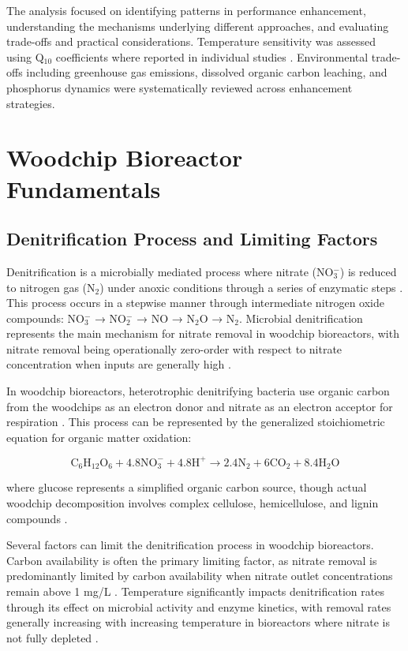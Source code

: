 \documentclass[12pt,a4paper]{article}
\begin{document}
The analysis focused on identifying patterns in performance enhancement, understanding the mechanisms underlying different approaches, and evaluating trade-offs and practical considerations. Temperature sensitivity was assessed using Q$_{10}$ coefficients where reported in individual studies \citep{RN242, RN258}. Environmental trade-offs including greenhouse gas emissions, dissolved organic carbon leaching, and phosphorus dynamics were systematically reviewed across enhancement strategies.

\section{Woodchip Bioreactor Fundamentals}

\subsection{Denitrification Process and Limiting Factors}

Denitrification is a microbially mediated process where nitrate (NO$_{3}^{-}$) is reduced to nitrogen gas (N$_{2}$) under anoxic conditions through a series of enzymatic steps \citep{RN242, RN629}. This process occurs in a stepwise manner through intermediate nitrogen oxide compounds: NO$_{3}^{-}$ → NO$_{2}^{-}$ → NO → N$_{2}$O → N$_{2}$. Microbial denitrification represents the main mechanism for nitrate removal in woodchip bioreactors, with nitrate removal being operationally zero-order with respect to nitrate concentration when inputs are generally high \citep{RN625, RN242}.

In woodchip bioreactors, heterotrophic denitrifying bacteria use organic carbon from the woodchips as an electron donor and nitrate as an electron acceptor for respiration \citep{RN242, RN725}. This process can be represented by the generalized stoichiometric equation for organic matter oxidation:

\begin{equation}
\text{C}_6\text{H}_{12}\text{O}_6 + 4.8\text{NO}_{3}^{-} + 4.8\text{H}^{+} \rightarrow 2.4\text{N}_{2} + 6\text{CO}_{2} + 8.4\text{H}_{2}\text{O}
\end{equation}

where glucose represents a simplified organic carbon source, though actual woodchip decomposition involves complex cellulose, hemicellulose, and lignin compounds \citep{RN725}.

Several factors can limit the denitrification process in woodchip bioreactors. Carbon availability is often the primary limiting factor, as nitrate removal is predominantly limited by carbon availability when nitrate outlet concentrations remain above 1 mg/L \citep{RN629, RN242}. Temperature significantly impacts denitrification rates through its effect on microbial activity and enzyme kinetics, with removal rates generally increasing with increasing temperature in bioreactors where nitrate is not fully depleted \citep{RN625, RN228, RN258}.
\end{document}
